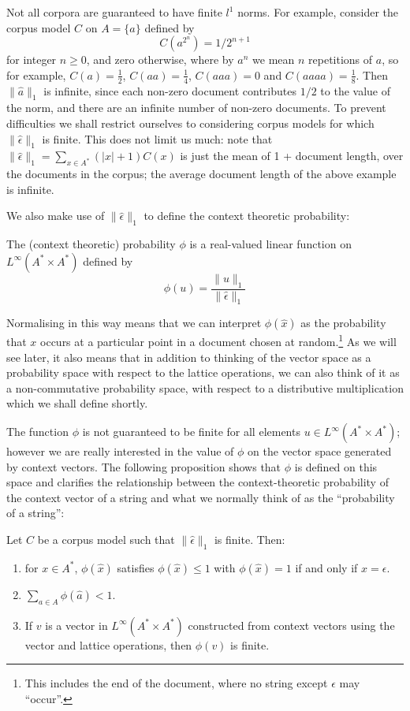 
Not all corpora are guaranteed to have finite $l^1$ norms. For example, consider the corpus model $C$ on $A = \{a\}$ defined by
$$C(a^{2^n}) = 1/2^{n+1}$$
for integer $n \ge 0$, and zero otherwise, where by $a^n$ we mean $n$ repetitions of $a$, so for example, $C(a) = \frac{1}{2}$, $C(aa) = \frac{1}{4}$, $C(aaa) = 0$ and $C(aaaa) = \frac{1}{8}$. Then $\|\hat{a}\|_1$ is infinite, since each non-zero document contributes $1/2$ to the value of the norm, and there are an infinite number of non-zero documents. To prevent difficulties we shall restrict ourselves to considering corpus models for which $\|\hat{\epsilon}\|_1$ is finite. This does not limit us much: note that $\|\hat{\epsilon}\|_1 = \sum_{x\in A^*}(|x| + 1)C(x)$ is just the mean of 1 + document length, over the documents in the corpus; the average document length of the above example is infinite.

We also make use of $\|\hat{\epsilon}\|_1$ to define the context theoretic probability:
\begin{defn}
The (context theoretic) probability $\phi$ is a real-valued linear function on $L^\infty(A^*\times A^*)$ defined by
$$\phi(u) = \frac{\|u\|_1}{\|\hat{\epsilon}\|_1}$$
\end{defn}
\noindent
Normalising in this way means that we can interpret $\phi(\hat{x})$ as the probability that $x$ occurs at a particular point in a document chosen at random.\footnote{This includes the end of the document, where no string except $\epsilon$ may ``occur''.} As we will see later, it also means that in addition to thinking of the vector space as a probability space with respect to the lattice operations, we can also think of it as a non-commutative probability space, with respect to a distributive multiplication which we shall define shortly.

The function $\phi$ is not guaranteed to be finite for all elements $u \in L^\infty(A^*\times A^*)$; however we are really interested in the value of $\phi$ on the vector space generated by context vectors. 
The following proposition shows that $\phi$ is defined on this space and clarifies the relationship between the context-theoretic probability of the context vector of a string and what we normally think of as the ``probability of a string'':
\begin{prop}
Let $C$ be a corpus model such that $\|\hat{\epsilon}\|_1$ is finite. Then:
\begin{enumerate}
\item for $x \in A^*$, $\phi(\hat{x})$ satisfies $\phi(\hat{x}) \le 1$ with $\phi(\hat{x}) = 1$ if and only if $x = \epsilon$.
\item $\sum_{a \in A} \phi(\hat{a}) < 1.$
\item If $v$ is a vector in $L^\infty(A^*\times A^*)$ constructed from context vectors using the vector and lattice operations, then $\phi(v)$ is finite.
\end{enumerate}
\end{prop}

